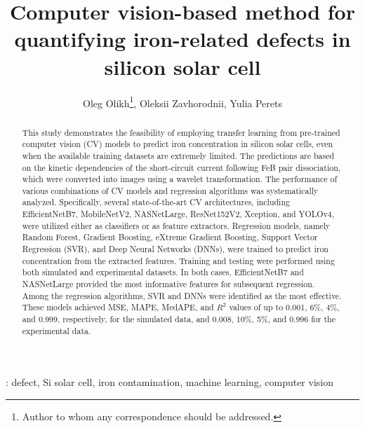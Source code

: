 \documentclass[10pt]{iopart}
\begin{document}
\title[Computer vision for quantifying Fe-related defects in Si solar cell]{Computer vision-based method for quantifying iron-related defects in silicon solar cell}

\author{Oleg Olikh\footnote{Author to whom any correspondence should be addressed.}, Oleksii Zavhorodnii, Yulia Perets}

\address{Taras Shevchenko National University of Kyiv, Kyiv 01601, Ukraine}


\begin{abstract}
This study demonstrates the feasibility of employing transfer learning from pre-trained computer vision (CV) models 
to predict iron concentration in silicon solar cells, even when the available training datasets are extremely limited. 
The predictions are based on the kinetic dependencies of the short-circuit current following FeB pair dissociation, 
which were converted into images using a wavelet transformation.
The performance of various combinations of CV models and regression algorithms was systematically analyzed. 
Specifically, several state-of-the-art CV architectures, 
including EfficientNetB7, MobileNetV2, NASNetLarge, ResNet152V2, Xception, and YOLOv4, 
were utilized either as classifiers or as feature extractors. 
Regression models, namely Random Forest, Gradient Boosting, eXtreme Gradient Boosting, Support Vector Regression (SVR), 
and Deep Neural Networks (DNNs), were trained to predict iron concentration from the extracted features.
Training and testing were performed using both simulated and experimental datasets. 
In both cases, EfficientNetB7 and NASNetLarge provided the most informative features for subsequent regression. 
Among the regression algorithms, SVR and DNNs were identified as the most effective. 
These models achieved MSE, MAPE, MedAPE, and $R^2$ values of up 
to 0.001, 6\%, 4\%, and 0.999, respectively, for the simulated data, 
and 0.008, 10\%, 5\%, and 0.996 for the experimental data.
\end{abstract}

%
\vspace{2pc}
: defect, Si solar cell, iron contamination, machine learning, computer vision

\submitto{\SST}
%
\end{document}
